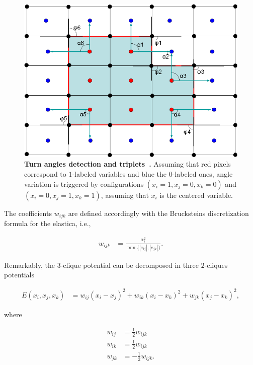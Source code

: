 \begin{figure}
\center
\includegraphics[scale=0.25]{figures/chapter4/elzehiry/turn-angles.png}
\caption{\textbf{Turn angles detection and triplets~\cite{zehiry10fast}.} Assuming that red pixels correspond to $1$-labeled variables and blue the $0$-labeled ones, angle variation is triggered by configurations $(x_i=1,x_j=0,x_k=0)$ and $(x_i=0,x_j=1,x_k=1)$, assuming that $x_i$ is the centered variable. }
\label{ch4:fig:elzehiry-turn-angles}
\end{figure}

The coefficients $w_{ijk}$ are defined accordingly with the Brucksteins discretization formula for the elastica, i.e.,

\begin{align*}
	w_{ijk} &= \frac{ \alpha_i ^2}{\min \{ |e_{ij}|,|e_{jk}| \} }.
\end{align*}

Remarkably, the $3$-clique potential can be decomposed in three $2$-cliques potentials 

\begin{align}
	E(x_i,x_j,x_k) &= w_{ij}(x_i-x_j)^2 + w_{ik}(x_i-x_k)^2 + w_{jk}(x_j-x_k)^2,
	\label{ch4:eq:elzehiry-pairwise}
\end{align}

where

\begin{align*}
	w_{ij} &= \frac{1}{2}w_{ijk} \\
	w_{ik} &= \frac{1}{2}w_{ijk} \\	
	w_{jk} &= -\frac{1}{2}w_{ijk}.
\end{align*}

